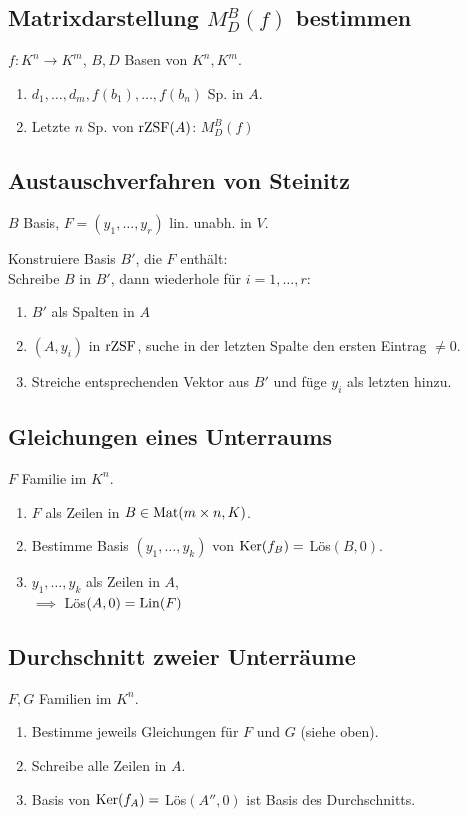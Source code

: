 \subsection*{Matrixdarstellung $M_D^B(f)$ bestimmen}
$f:K^n\to K^m$, $B,D$ Basen von $K^n,K^m$.
\begin{enumerate}
	\item $d_1,\dots,d_m,f(b_1),\dots,f(b_n)$ Sp. in $A$.
	\item Letzte $n$ Sp. von $\operatorname{rZSF}(A)$: $M_D^B(f)$
\end{enumerate}

\subsection*{Austauschverfahren von Steinitz}
$B$ Basis, $F=(y_1,\dots,y_r)$ lin. unabh. in $V$.

Konstruiere Basis $B'$, die $F$ enthält: \\
Schreibe $B$ in $B'$, dann wiederhole für $i=1,\dots,r$:
\begin{enumerate}
	\item $B'$ als Spalten in $A$
	\item $(A,y_i)$ in $\operatorname{rZSF}$, suche in der letzten Spalte den ersten Eintrag $\neq 0$.
	\item Streiche entsprechenden Vektor aus $B'$ und füge $y_i$ als letzten hinzu.
\end{enumerate}

\subsection*{Gleichungen eines Unterraums}
$F$ Familie im $K^n$.

\begin{enumerate}
	\item $F$ als Zeilen in $B\in\operatorname{Mat}(m \times n,K)$.
	\item Bestimme Basis $(y_1,\dots,y_k)$ von $\operatorname{Ker}(f_B)=$ Lös$(B,0)$.
	\item $y_1,\dots,y_k$ als Zeilen in $A$, \\
		$\implies$ Lös$(A,0)=\operatorname{Lin}(F)$ 
\end{enumerate}

\subsection*{Durchschnitt zweier Unterräume}
$F,G$ Familien im $K^n$.
\begin{enumerate}
	\item Bestimme jeweils Gleichungen für $F$ und $G$ (siehe oben).
	\item Schreibe alle Zeilen in $A$.
	\item Basis von $\operatorname{Ker}(f_A)=$ Lös$(A'',0)$ ist Basis des Durchschnitts.
\end{enumerate}
